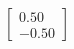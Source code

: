 \documentclass[preview]{standalone}
\begin{document}
\begin{align*}
\begin{bmatrix} 0.50 \\ -0.50 \end{bmatrix}
\end{align*}
\end{document}
